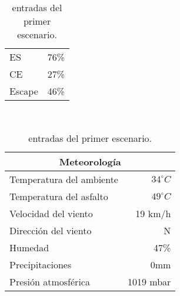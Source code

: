 \documentclass[12pt,a4paper,twoside,spanish]{article}      %
\begin{document}
\begin{table}[H]
\begin{tabular}{lr}
        ES & 76\% \\
        CE & 27\% \\
        Escape & 46\% \\ \bottomrule
    \end{tabular} \\ \vspace{1em}
    \begin{tabular}{lr}
        \toprule
        \multicolumn{2}{c}{\textbf{Meteorología}} \\ \midrule
        Temperatura del ambiente & $34^\circ C$ \\
        Temperatura del asfalto & $49^\circ C$ \\
        Velocidad del viento & 19 km/h \\
        Dirección del viento & N \\
        Humedad & 47\% \\
        Precipitaciones & 0mm \\
        Presión atmosférica & 1019 mbar \\ \bottomrule
    \end{tabular} \\ \vspace{1em}
    \caption{entradas del primer escenario.}
    \label{tab:in_esc_1}
\end{table}
\end{document}
